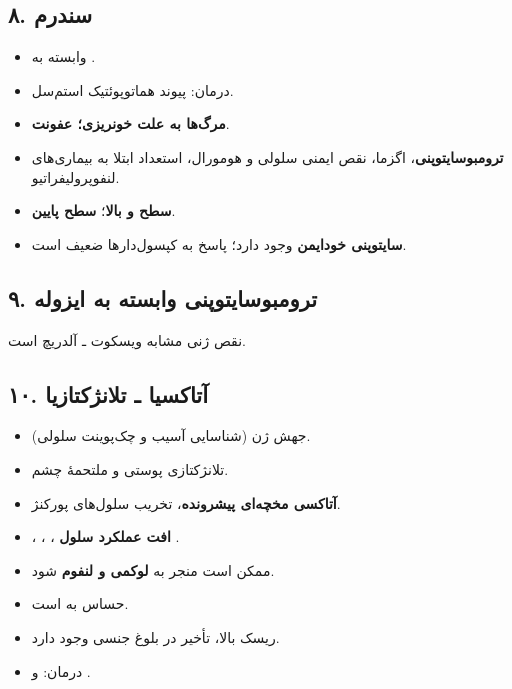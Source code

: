 \documentclass[12pt,a4paper]{article}
\begin{document}
\subsection*{۸. سندرم }
\begin{itemize}
\item وابسته به .
\item درمان: پیوند هماتوپوئتیک استم‌سل.
\item \textbf{ مرگ‌ها به علت خونریزی؛  عفونت}.
\item \textbf{ترومبوسایتوپنی}، اگزما، نقص ایمنی سلولی و هومورال، استعداد ابتلا
به بیماری‌های لنفوپرولیفراتیو.
\item \textbf{سطح  و  بالا}؛ \textbf{سطح  پایین}.
\item \textbf{سایتوپنی خودایمن} وجود دارد؛ پاسخ به کپسول‌دارها ضعیف است.
\end{itemize}

\subsection*{۹. ترومبوسایتوپنی وابسته به  ایزوله}
نقص ژنی مشابه ویسکوت ـ آلدریچ است.

\subsection*{۱۰. آتاکسیا ـ تلانژکتازیا}
\begin{itemize}
\item جهش ژن  (شناسایی آسیب  و چک‌پوینت سلولی).
\item تلانژکتازی پوستی و ملتحمهٔ چشم.
\item \textbf{آتاکسی مخچه‌ای پیشرونده}، تخریب سلول‌های پورکنژ.
\item {}، ، ،
\textbf{افت عملکرد سلول }.
\item ممکن است منجر به \textbf{لوکمی و لنفوم} شود.
\item حساس به  است.
\item ریسک  بالا، تأخیر در بلوغ جنسی وجود دارد.
\item درمان:  و .
\end{itemize}
\end{document}
